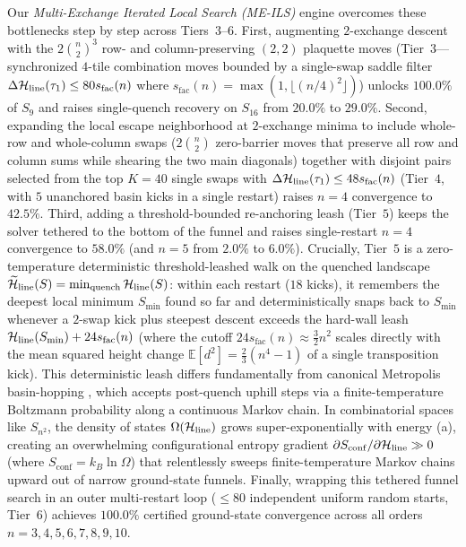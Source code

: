 Our \emph{Multi-Exchange Iterated Local Search (ME-ILS)} engine overcomes these bottlenecks step by step across Tiers~$3\text{--}6$. First, augmenting $2$-exchange descent with the $2\binom{n}{2}^3$ row- and column-preserving $(2,2)$ plaquette moves (Tier~$3$---synchronized $4$-tile combination moves bounded by a single-swap saddle filter $\Delta\mathcal{H}_{\mathrm{line}}(\tau_1) \le 80 s_{\mathrm{fac}}(n)$ where $s_{\mathrm{fac}}(n) = \max(1, \lfloor(n/4)^2\rfloor)$) unlocks $100.0\%$ of $S_9$ and raises single-quench recovery on $S_{16}$ from $20.0\%$ to $29.0\%$. Second, expanding the local escape neighborhood at $2$-exchange minima to include whole-row and whole-column swaps ($2\binom{n}{2}$ zero-barrier moves that preserve all row and column sums while shearing the two main diagonals) together with disjoint pairs selected from the top $K=40$ single swaps with $\Delta\mathcal{H}_{\mathrm{line}}(\tau_1) \le 48 s_{\mathrm{fac}}(n)$ (Tier~$4$, with $5$ unanchored basin kicks in a single restart) raises $n=4$ convergence to $42.5\%$. Third, adding a threshold-bounded re-anchoring leash (Tier~$5$) keeps the solver tethered to the bottom of the funnel and raises single-restart $n=4$ convergence to $58.0\%$ (and $n=5$ from $2.0\%$ to $6.0\%$). Crucially, Tier~$5$ is a zero-temperature deterministic threshold-leashed walk on the quenched landscape $\widetilde{\mathcal{H}}_{\mathrm{line}}(S) = \min_{\text{quench}}\mathcal{H}_{\mathrm{line}}(S)$: within each restart ($18$ kicks), it remembers the deepest local minimum $S_{\min}$ found so far and deterministically snaps back to $S_{\min}$ whenever a $2$-swap kick plus steepest descent exceeds the hard-wall leash $\mathcal{H}_{\mathrm{line}}(S_{\min}) + 24 s_{\mathrm{fac}}(n)$ (where the cutoff $24 s_{\mathrm{fac}}(n) \approx \frac{3}{2}n^2$ scales directly with the mean squared height change $\mathbb{E}[d^2] = \frac{2}{3}(n^4-1)$ of a single transposition kick). This deterministic leash differs fundamentally from canonical Metropolis basin-hopping \cite{wales1997global,wales2003energy}, which accepts post-quench uphill steps via a finite-temperature Boltzmann probability along a continuous Markov chain. In combinatorial spaces like $S_{n^2}$, the density of states $\Omega(\mathcal{H}_{\mathrm{line}})$ grows super-exponentially with energy (a), creating an overwhelming configurational entropy gradient $\partial S_{\mathrm{conf}}/\partial\mathcal{H}_{\mathrm{line}} \gg 0$ (where $S_{\mathrm{conf}} = k_B \ln \Omega$) that relentlessly sweeps finite-temperature Markov chains upward out of narrow ground-state funnels. Finally, wrapping this tethered funnel search in an outer multi-restart loop ($\le 80$ independent uniform random starts, Tier~$6$) achieves $100.0\%$ certified ground-state convergence across all orders $n = 3, 4, 5, 6, 7, 8, 9, 10$.

